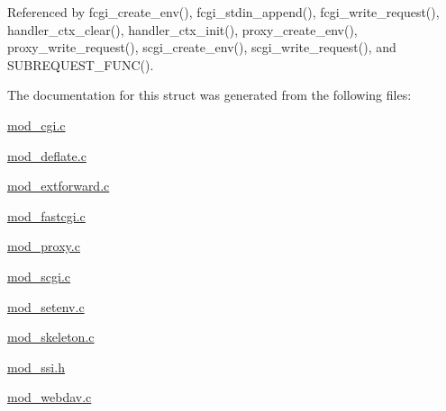 Referenced by fcgi\-\_\-create\-\_\-env(), fcgi\-\_\-stdin\-\_\-append(), fcgi\-\_\-write\-\_\-request(), handler\-\_\-ctx\-\_\-clear(), handler\-\_\-ctx\-\_\-init(), proxy\-\_\-create\-\_\-env(), proxy\-\_\-write\-\_\-request(), scgi\-\_\-create\-\_\-env(), scgi\-\_\-write\-\_\-request(), and S\-U\-B\-R\-E\-Q\-U\-E\-S\-T\-\_\-\-F\-U\-N\-C().



The documentation for this struct was generated from the following files\-:\begin{DoxyCompactItemize}
\item 
\hyperlink{mod__cgi_8c}{mod\-\_\-cgi.\-c}\item 
\hyperlink{mod__deflate_8c}{mod\-\_\-deflate.\-c}\item 
\hyperlink{mod__extforward_8c}{mod\-\_\-extforward.\-c}\item 
\hyperlink{mod__fastcgi_8c}{mod\-\_\-fastcgi.\-c}\item 
\hyperlink{mod__proxy_8c}{mod\-\_\-proxy.\-c}\item 
\hyperlink{mod__scgi_8c}{mod\-\_\-scgi.\-c}\item 
\hyperlink{mod__setenv_8c}{mod\-\_\-setenv.\-c}\item 
\hyperlink{mod__skeleton_8c}{mod\-\_\-skeleton.\-c}\item 
\hyperlink{mod__ssi_8h}{mod\-\_\-ssi.\-h}\item 
\hyperlink{mod__webdav_8c}{mod\-\_\-webdav.\-c}\end{DoxyCompactItemize}
